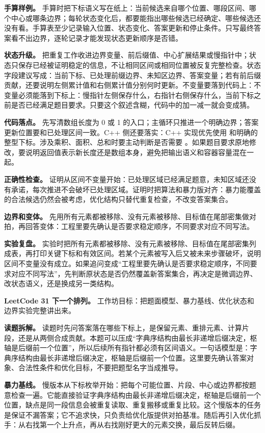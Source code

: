 \textbf{手算样例。} 手算时把下标语义写在纸上：当前候选来自哪个位置、哪段区间、哪个中心或哪条边界；每轮状态变化后，都要能指出哪些候选已经确定、哪些候选还没有看。手算表至少记录输入位置、状态变化、答案更新和停止条件。只写最终答案看不出边界，逐轮记录才能发现状态更新顺序是否错。

\textbf{状态升级。} 把重复工作收进边界变量、前后缀值、中心扩展结果或慢指针中；状态只保存已经被证明稳定的信息，不让相同区间或相同位置被反复完整检查。状态字段建议写成：当前下标、已处理前缀边界、未知区边界、答案变量；若有前后缀贡献，还要说明左侧累计值和右侧累计值分别何时更新。不变量要落到代码上：不变量必须能落到下标上：慢指针左侧保存什么，右指针右侧保存什么，当前下标之前是否已经满足题目要求。只要这个叙述含糊，代码中的加一减一就会变成猜。

\textbf{代码落点。} 先写清数组长度为 0 或 1 的入口；主循环只推进一个明确边界；答案更新位置要和已处理区间一致。C++ 侧还要落实：C++ 实现优先使用  和明确的整型下标。涉及乘积、面积、总和时要主动判断是否需要 。如果题目要求原地修改，要说明返回值表示新长度还是数组本身，避免把输出语义和容器容量混在一起。

\textbf{正确性检查。} 证明从区间不变量开始：已处理区域已经满足题意，未知区域还没有承诺，每次推进不会破坏已处理区域。证明时把算法和暴力版对齐：暴力能覆盖的合法候选仍然会被考虑，优化结构只替代重复检查，不改变答案集合。

\textbf{边界和变体。} 先用所有元素都被移除、没有元素被移除、目标值在尾部密集做对拍，再回答变体：工程里要先确认是否要求稳定顺序，不同要求对应不同写法。

\textbf{实验复盘。} 实验时把所有元素都被移除、没有元素被移除、目标值在尾部密集列成表，再打印关键下标和有效区间。若某个元素被写入后又被未来步骤破坏，说明区间不变量没有成立。如果追问变成“工程里要先确认是否要求稳定顺序，不同要求对应不同写法”，先判断原状态是否仍然覆盖新答案集合，再决定是微调边界、改状态语义，还是换成另一类结构。

\noindent\textbf{LeetCode 31 下一个排列。} 工作坊目标：把题面模型、暴力基线、优化状态和边界实验完整讲出来。

\textbf{读题拆解。} 读题时先问答案落在哪些下标上，是保留元素、重排元素、计算片段，还是从两侧合成贡献。本题可以压成“字典序结构由最长非递增后缀决定，枢轴是后缀前一个位置”，所以后续所有指针都必须有区间语义。一句话模型是：字典序结构由最长非递增后缀决定，枢轴是后缀前一个位置。这里要先确认答案对象、合法性条件和优化目标，不要把题型名字当成推导。

\textbf{暴力基线。} 慢版本从下标枚举开始：把每个可能位置、片段、中心或边界都按题意检查一遍。它能直接验证字典序结构由最长非递增后缀决定，枢轴是后缀前一个位置，缺点是同一段信息会被重复读取、重复搬移或重复比较。这个慢版本的任务是保证不漏答案；它不追求快，只负责给优化版提供对拍基准。随后再引入优化抓手：从右找第一个上升点，再从右找刚好更大的元素交换，最后反转后缀。

